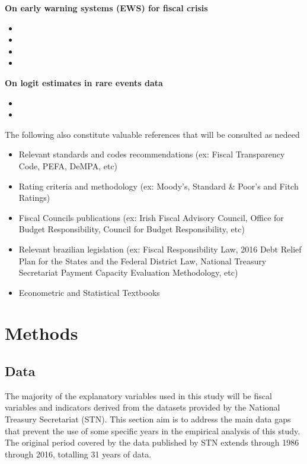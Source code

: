 \documentclass[12pt]{article}
\begin{document}
\textbf{On early warning systems (EWS) for fiscal crisis}

\begin{itemize}
\item {}
\item {}
\item {}
\item {}
\end{itemize}

\textbf{On logit estimates in rare events data}

\begin{itemize}
\item {}	
\item {}
\end{itemize}

The following also constitute valuable references that will be consulted as nedeed

\begin{itemize}
\item Relevant standards and codes recommendations (ex: Fiscal Transparency Code, PEFA, DeMPA, etc)
\item Rating criteria and methodology (ex: Moody's, Standard \& Poor's and Fitch Ratings)
\item Fiscal Councils publications (ex: Irish Fiscal Advisory Council, Office for Budget Responsibility, Council for Budget Responsibility, etc)
\item Relevant brazilian legislation (ex: Fiscal Responsibility Law, 2016 Debt Relief Plan for the States and the Federal District Law, National Treasury Secretariat Payment Capacity Evaluation Methodology, etc)
\item Econometric and Statistical Textbooks 
\end{itemize}

\newpage
\section{Methods}

\subsection{Data}

The majority of the explanatory variables used in this study will be fiscal variables and indicators derived from the datasets provided by the National Treasury Secretariat (STN). This section aim is to address the main data gaps that prevent the use of some specific years in the empirical analysis of this study. The original period covered by the data published by STN extends through 1986 through 2016, totalling 31 years of data. 
\end{document}
